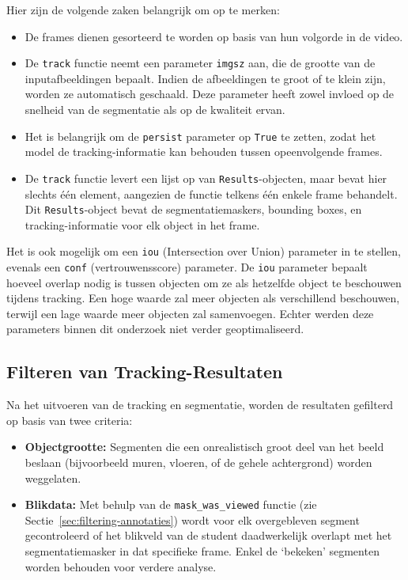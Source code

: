 Hier zijn de volgende zaken belangrijk om op te merken:
\begin{itemize}
    \item De frames dienen gesorteerd te worden op basis van hun volgorde in de video.
    \item De \texttt{track} functie neemt een parameter \texttt{imgsz} aan, die de grootte van de inputafbeeldingen bepaalt.
    Indien de afbeeldingen te groot of te klein zijn, worden ze automatisch geschaald.
    Deze parameter heeft zowel invloed op de snelheid van de segmentatie als op de kwaliteit ervan.
    \item Het is belangrijk om de \texttt{persist} parameter op \texttt{True} te zetten, 
    zodat het model de tracking-informatie kan behouden tussen opeenvolgende frames.
    \item De \texttt{track} functie levert een lijst op van \texttt{Results}-objecten, maar bevat hier slechts één element, aangezien de functie telkens één enkele frame behandelt.
    Dit \texttt{Results}-object bevat de segmentatiemaskers, bounding boxes, en tracking-informatie voor elk object in het frame.
\end{itemize}
Het is ook mogelijk om een \texttt{iou} (Intersection over Union) parameter in te stellen, evenals een \texttt{conf} (vertrouwensscore) parameter.
De \texttt{iou} parameter bepaalt hoeveel overlap nodig is tussen objecten om ze als hetzelfde object te beschouwen tijdens tracking.
Een hoge waarde zal meer objecten als verschillend beschouwen, terwijl een lage waarde meer objecten zal samenvoegen.
Echter werden deze parameters binnen dit onderzoek niet verder geoptimaliseerd.

\subsection{Filteren van Tracking-Resultaten}

Na het uitvoeren van de tracking en segmentatie, worden de resultaten gefilterd op basis van twee criteria:
\begin{itemize}
    \item \textbf{Objectgrootte:} Segmenten die een onrealistisch groot deel van het beeld beslaan (bijvoorbeeld muren, vloeren, of de gehele achtergrond) worden weggelaten.
    \item \textbf{Blikdata:} Met behulp van de \texttt{mask\_was\_viewed} functie (zie Sectie~\ref{sec:filtering-annotaties}) 
    wordt voor elk overgebleven segment gecontroleerd of het blikveld van de student daadwerkelijk overlapt met het segmentatiemasker in dat specifieke frame. 
    Enkel de `bekeken' segmenten worden behouden voor verdere analyse.
\end{itemize}

